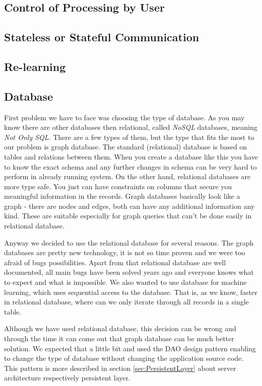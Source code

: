 \subsection{Control of Processing by User}
\label{ssec:ReportPipeline}


\subsection{Stateless or Stateful Communication}

\subsection{Re-learning}


\subsection{Database}


First problem we have to face was choosing the type of database. As you may know there are other databases then relational, called \emph{NoSQL} databases, meaning \emph{Not Only SQL}. There are a few types of them, but the type that fits the most to our problem is graph database. The standard (relational) database is based on tables and relations between them. When you create a database like this you have to know the exact schema and any further changes in schema can be very hard to perform in already running system. On the other hand, relational databases are more type safe. You just can have constraints on columns that secure you meaningful information in the records. Graph databases basically look like a graph - there are nodes and edges, both can have any additional information any kind. These are suitable especially for graph queries that can't be done easily in relational database.

Anyway we decided to use the relational database for several reasons.
The graph databases are pretty new technology, it is not so time proven and we were too afraid of bugs possibilities. Apart from that relational database are well documented, all main bugs have been solved years ago and everyone knows what to expect and what is impossible.
We also wanted to use database for machine learning, which uses sequential access to the database. That is, as we know, faster in relational database, where can we only iterate through all records in a single table.

Although we have used relational database, this decision can be wrong and through the time it can come out that graph database can be much better solution. We expected that a little bit and used the DAO design pattern enabling to change the type of database without changing the application source code. This pattern is more described in section \ref{sec:PersistentLayer} about server architecture respectively persistent layer.

